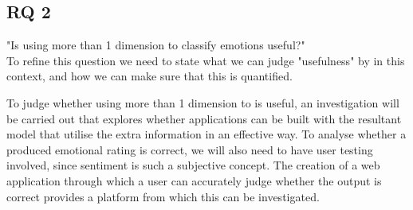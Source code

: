 \subsection{RQ 2}
"Is using more than 1 dimension to classify emotions useful?"
\\ To refine this question we need to state what we can judge "usefulness" by in this context, and how we can make sure that this is quantified.

To judge whether using more than 1 dimension to is useful, an investigation will be carried out that explores whether applications can be built with the resultant model that utilise the extra information in an effective way. To analyse whether a produced emotional rating is correct, we will also need to have user testing involved, since sentiment is such a subjective concept. The creation of a web application through which a user can accurately judge whether the output is correct provides a platform from which this can be investigated.


